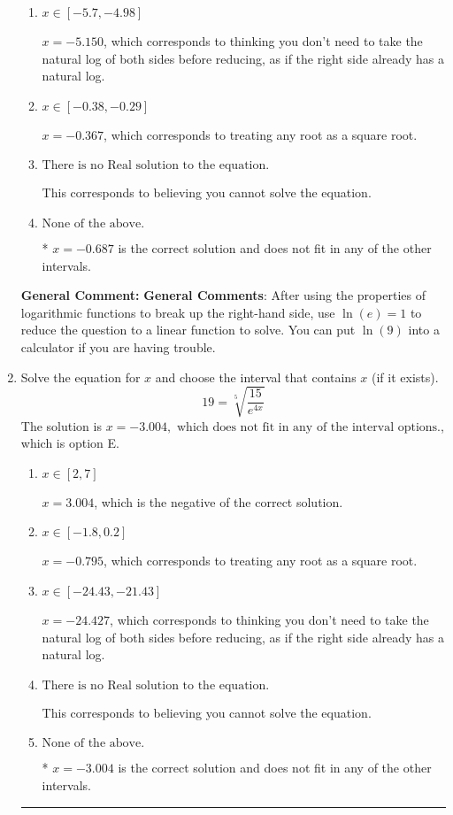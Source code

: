 \documentclass{extbook}[14pt]
\newcommand{\litem}[1]{\item #1

\rule{\textwidth}{0.4pt}}
\begin{document}
\begin{enumerate}
{\begin{enumerate}[label=\Alph*.]
$x = 0.687$, which is the negative of the correct solution.
\item \( x \in [-5.7, -4.98] \)

$x = -5.150$, which corresponds to thinking you don't need to take the natural log of both sides before reducing, as if the right side already has a natural log.
\item \( x \in [-0.38, -0.29] \)

$x = -0.367$, which corresponds to treating any root as a square root.
\item \( \text{There is no Real solution to the equation.} \)

This corresponds to believing you cannot solve the equation.
\item \( \text{None of the above.} \)

* $x = -0.687$ is the correct solution and does not fit in any of the other intervals.
\end{enumerate}

\textbf{General Comment:} \textbf{General Comments}: After using the properties of logarithmic functions to break up the right-hand side, use $\ln(e) = 1$ to reduce the question to a linear function to solve. You can put $\ln(9)$ into a calculator if you are having trouble.
}
\litem{
 Solve the equation for $x$ and choose the interval that contains $x$ (if it exists).
\[  19 = \sqrt[5]{\frac{15}{e^{4x}}} \]The solution is \( x = -3.004, \text{ which does not fit in any of the interval options.} \), which is option E.\begin{enumerate}[label=\Alph*.]
\item \( x \in [2, 7] \)

$x = 3.004$, which is the negative of the correct solution.
\item \( x \in [-1.8, 0.2] \)

$x = -0.795$, which corresponds to treating any root as a square root.
\item \( x \in [-24.43, -21.43] \)

$x = -24.427$, which corresponds to thinking you don't need to take the natural log of both sides before reducing, as if the right side already has a natural log.
\item \( \text{There is no Real solution to the equation.} \)

This corresponds to believing you cannot solve the equation.
\item \( \text{None of the above.} \)

* $x = -3.004$ is the correct solution and does not fit in any of the other intervals.
\end{enumerate}

}
\end{enumerate}
\end{document}
